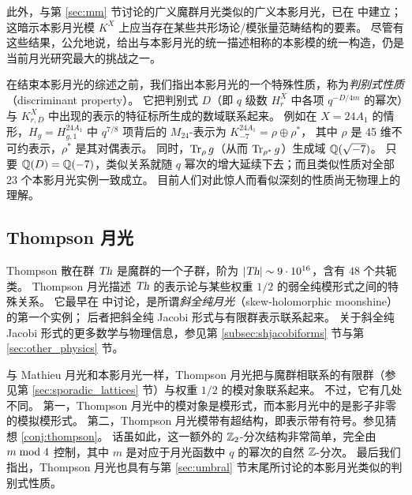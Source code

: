 此外，与第 \ref{sec:mm} 节讨论的广义魔群月光类似的广义本影月光，已在 \cite{GUM} 中建立；
这暗示本影月光模 $K^X$ 上应当存在某些共形场论/模张量范畴结构的要素。
尽管有这些结果，公允地说，给出与本影月光的统一描述相称的本影模的统一构造，仍是当前月光研究最大的挑战之一。

在结束本影月光的综述之前，我们指出本影月光的一个特殊性质，称为\emph{判别式性质}（discriminant property）。
它把判别式 $D$（即 $q$ 级数 $H^X_r$ 中各项 $q^{-D/4m}$ 的幂次）与 $K_{r,D}^X$ 中出现的表示的特征标所生成的数域联系起来。
例如在 $X=24A_1$ 的情形，$H_g= H^{24A_1}_{g,1}$ 中 $q^{7/8}$ 项背后的 $M_{24}$-表示为 $K^{24A_1}_{-7} = \rho \oplus \rho^\ast$，
其中 $\rho$ 是 45 维不可约表示，$\rho^\ast$ 是其对偶表示。
同时，$\operatorname{Tr}_\rho g$（从而 $\operatorname{Tr}_{\rho^\ast} g$）生成域 $\mathbb{Q}(\sqrt{-7})$。
只要 $\mathbb{Q}(D)=\mathbb{Q}(-7)$，类似关系就随 $q$ 幂次的增大延续下去；而且类似性质对全部 23 个本影月光实例一致成立。
目前人们对此惊人而看似深刻的性质尚无物理上的理解。


\subsection{Thompson 月光}

Thompson 散在群 $\operatorname{\textsl{Th}}$ 是魔群的一个子群，阶为 $|{\rm \it \operatorname{\textsl{Th}}}|\sim9\cdot10^{16}$，含有 $48$ 个共轭类。
Thompson 月光描述 $\operatorname{\textsl{Th}}$ 的表示论与某些权重 $1/2$ 的弱全纯模形式之间的特殊关系。
它最早在 \cite{Harvey:2015mca} 中讨论，是所谓\emph{斜全纯月光}（skew-holomorphic moonshine）\cite{skew_hol_moonshine} 的第一个实例；
后者把斜全纯 Jacobi 形式与有限群表示联系起来。
关于斜全纯 Jacobi 形式的更多数学与物理信息，参见第 \ref{subsec:shjacobiforms} 节与第 \ref{sec:other_physics} 节。

与 Mathieu 月光和本影月光一样，Thompson 月光把与魔群相联系的有限群（参见第 \ref{sec:sporadic_lattices} 节）与权重 $1/2$ 的模对象联系起来。
不过，它有几处不同。
第一，Thompson 月光中的模对象是模形式，而本影月光中的是影子非零的模拟模形式。
第二，Thompson 月光模带有超结构，即表示带有符号。参见猜想 \ref{conj:thompson}。
话虽如此，这一额外的 $\mathbb{Z}_2$-分次结构非常简单，完全由 $m {\rm \;mod\;} 4$ 控制，其中 $m$ 是对应于月光函数中 $q$ 的幂次的自然 $\mathbb{Z}$-分次。
最后我们指出，Thompson 月光也具有与第 \ref{sec:umbral} 节末尾所讨论的本影月光类似的判别式性质。

